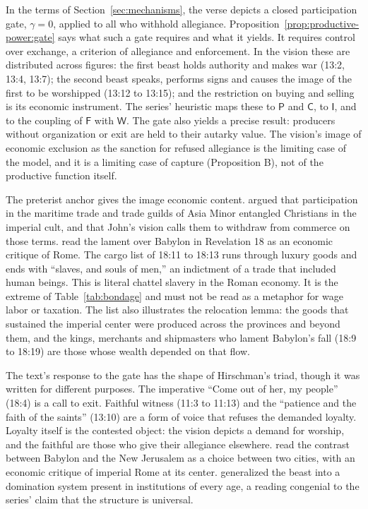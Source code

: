 \documentclass[11pt,letterpaper]{article}
\theoremstyle{definition}
\theoremstyle{remark}
\newcommand{\pF}{\mathsf{F}}
\newcommand{\pP}{\mathsf{P}}
\newcommand{\pI}{\mathsf{I}}
\newcommand{\pC}{\mathsf{C}}
\newcommand{\pW}{\mathsf{W}}
\begin{document}
In the terms of Section~\ref{sec:mechanisms}, the verse depicts a closed participation gate, $\gamma=0$, applied to all who withhold allegiance. Proposition~\ref{prop:productive-power:gate} says what such a gate requires and what it yields. It requires control over exchange, a criterion of allegiance and enforcement. In the vision these are distributed across figures: the first beast holds authority and makes war (13:2, 13:4, 13:7); the second beast speaks, performs signs and causes the image of the first to be worshipped (13:12 to 13:15); and the restriction on buying and selling is its economic instrument. The series' heuristic maps these to $\pP$ and $\pC$, to $\pI$, and to the coupling of $\pF$ with $\pW$. The gate also yields a precise result: producers without organization or exit are held to their autarky value. The vision's image of economic exclusion as the sanction for refused allegiance is the limiting case of the model, and it is a limiting case of capture (Proposition B), not of the productive function itself.

The preterist anchor gives the image economic content. \citet{kraybill1996} argued that participation in the maritime trade and trade guilds of Asia Minor entangled Christians in the imperial cult, and that John's vision calls them to withdraw from commerce on those terms. \citet{bauckham1991} read the lament over Babylon in Revelation 18 as an economic critique of Rome. The cargo list of 18:11 to 18:13 runs through luxury goods and ends with ``slaves, and souls of men,'' an indictment of a trade that included human beings. This is literal chattel slavery in the Roman economy. It is the extreme of Table~\ref{tab:bondage} and must not be read as a metaphor for wage labor or taxation. The list also illustrates the relocation lemma: the goods that sustained the imperial center were produced across the provinces and beyond them, and the kings, merchants and shipmasters who lament Babylon's fall (18:9 to 18:19) are those whose wealth depended on that flow.

The text's response to the gate has the shape of Hirschman's triad, though it was written for different purposes. The imperative ``Come out of her, my people'' (18:4) is a call to exit. Faithful witness (11:3 to 11:13) and the ``patience and the faith of the saints'' (13:10) are a form of voice that refuses the demanded loyalty. Loyalty itself is the contested object: the vision depicts a demand for worship, and the faithful are those who give their allegiance elsewhere. \citet{rossing1999} read the contrast between Babylon and the New Jerusalem as a choice between two cities, with an economic critique of imperial Rome at its center. \citet{wink1992} generalized the beast into a domination system present in institutions of every age, a reading congenial to the series' claim that the structure is universal.
\end{document}
